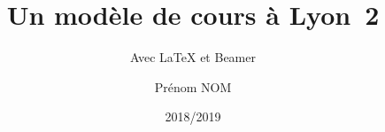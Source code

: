 \title{Un modèle de cours à Lyon~2}
\subtitle{Avec \LaTeX{} et Beamer}
\author{Prénom NOM}
\date{2018/2019}
